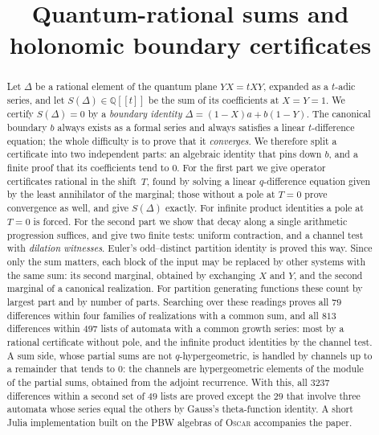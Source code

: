 \documentclass[11pt,a4paper]{article}
\title{Quantum-rational sums and holonomic boundary certificates}
\author{}\date{}
\newcommand{\Q}{\mathbb Q}
\theoremstyle{plain}
\theoremstyle{definition}
\theoremstyle{remark}
\begin{document}
\maketitle\vspace{-3em}

\begin{abstract}
Let $\Delta$ be a rational element of the quantum plane $YX=tXY$, expanded
as a $t$-adic series, and let $S(\Delta)\in\Q[[t]]$ be the sum of its
coefficients at $X=Y=1$. We certify $S(\Delta)=0$ by a \emph{boundary
identity} $\Delta=(1-X)a+b(1-Y)$. The canonical boundary $b$ always exists
as a formal series and always satisfies a linear $t$-difference equation; the
whole difficulty is to prove that it \emph{converges}. We therefore split a
certificate into two independent parts: an algebraic identity that pins down
$b$, and a finite proof that its coefficients tend to $0$. For the first part
we give operator certificates rational in the shift~$T$, found by solving a
linear $q$-difference equation given by the least annihilator of the marginal;
those without a pole at $T=0$ prove convergence as well, and give $S(\Delta)$
exactly. For infinite product
identities a pole at $T=0$ is forced. For the second part we show that decay
along a single arithmetic
progression suffices, and give two finite tests: uniform contraction, and a
channel test with \emph{dilation witnesses}. Euler's odd--distinct partition
identity is proved this way. Since only the sum matters, each block of the
input may be replaced by other systems with the same sum: its second marginal,
obtained by exchanging $X$ and $Y$, and the second marginal of a canonical
realization. For partition generating functions these count by largest part
and by number of parts. Searching over these readings proves all $79$
differences within four families of realizations with a common sum, and all
$813$ differences within $497$ lists of automata with a common growth series:
most by a rational certificate without pole, and the infinite product
identities by the channel test. A sum side, whose partial sums are not
$q$-hypergeometric, is handled by channels up to a remainder that tends to $0$:
the channels are hypergeometric elements of the module of the partial sums,
obtained from the adjoint recurrence. With this, all $3237$ differences within
a second set of $49$ lists are proved except the $29$ that involve three
automata whose series equal the others by Gauss's theta-function identity. A short Julia
implementation built on the PBW algebras of \textsc{Oscar} accompanies the
paper.
\end{abstract}
\end{document}
